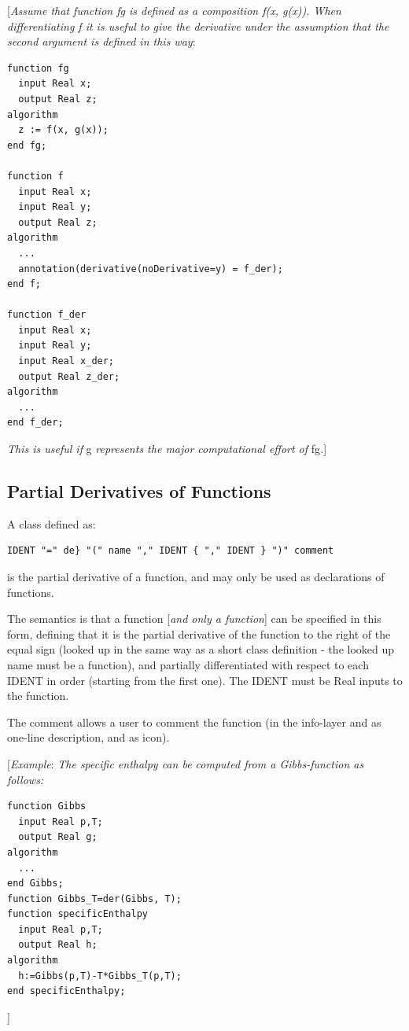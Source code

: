 \documentclass[10pt,a4paper]{report}
\def\doublelabel#1{\label{#1}\hypertarget{#1}{}}
\begin{document}
{[}\emph{Assume that function fg is defined as a composition f(x, g(x)).
When differentiating f it is useful to give the derivative under the
assumption that the second argument is defined in this way}:

\begin{lstlisting}[language=modelica]
function fg
  input Real x;
  output Real z;
algorithm
  z := f(x, g(x));
end fg;

function f
  input Real x;
  input Real y;
  output Real z;
algorithm
  ...
  annotation(derivative(noDerivative=y) = f_der);
end f;

function f_der
  input Real x;
  input Real y;
  input Real x_der;
  output Real z_der;
algorithm
  ...
end f_der;
\end{lstlisting}
\emph{This is useful if} g \emph{represents the major computational
effort of} fg\emph{.}{]}

\subsection{Partial Derivatives of Functions}\doublelabel{partial-derivatives-of-functions}

A class defined as:
\begin{lstlisting}[language=grammar]
IDENT "=" de} "(" name "," IDENT { "," IDENT } ")" comment
\end{lstlisting}

is the partial derivative of a function, and may only be used as
declarations of functions.

The semantics is that a function {[}\emph{and only a function}{]} can be
specified in this form, defining that it is the partial derivative of
the function to the right of the equal sign (looked up in the same way
as a short class definition - the looked up name must be a function),
and partially differentiated with respect to each IDENT in order
(starting from the first one). The IDENT must be Real inputs to the
function.

The comment allows a user to comment the function (in the info-layer and
as one-line description, and as icon).

{[}\emph{Example}: \emph{The specific enthalpy can be computed from a
Gibbs-function as follows:}

\begin{lstlisting}[language=modelica]
function Gibbs
  input Real p,T;
  output Real g;
algorithm
  ...
end Gibbs;
function Gibbs_T=der(Gibbs, T);
function specificEnthalpy
  input Real p,T;
  output Real h;
algorithm
  h:=Gibbs(p,T)-T*Gibbs_T(p,T);
end specificEnthalpy;
\end{lstlisting}
{]}
\end{document}
